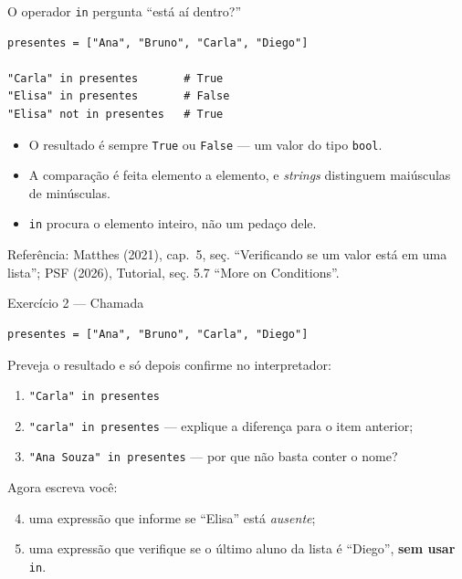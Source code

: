 \documentclass[aspectratio=169]{beamer}
\newcommand{\fonte}[1]{\vfill{\scriptsize\color{UFSGray}Refer\^encia: #1}}
\begin{document}
\begin{frame}[fragile]{O operador \texttt{in} pergunta ``está aí dentro?''}
\begin{lstlisting}
presentes = ["Ana", "Bruno", "Carla", "Diego"]

"Carla" in presentes       # True
"Elisa" in presentes       # False
"Elisa" not in presentes   # True
\end{lstlisting}

\begin{itemize}
  \item O resultado é sempre \texttt{True} ou \texttt{False} --- um valor do tipo \texttt{bool}.
  \item A comparação é feita elemento a elemento, e \emph{strings} distinguem maiúsculas de minúsculas.
  \item \texttt{in} procura o elemento inteiro, não um pedaço dele.
\end{itemize}

\fonte{Matthes (2021), cap.\ 5, se\c{c}. ``Verificando se um valor est\'a em uma lista''; PSF (2026), Tutorial, se\c{c}. 5.7 ``More on Conditions''.}
\end{frame}

\begin{frame}[fragile]{Exercício 2 --- Chamada}
\begin{lstlisting}
presentes = ["Ana", "Bruno", "Carla", "Diego"]
\end{lstlisting}

Preveja o resultado e só depois confirme no interpretador:
\begin{enumerate}
  \item \texttt{"Carla" in presentes}
  \item \texttt{"carla" in presentes} --- explique a diferença para o item anterior;
  \item \texttt{"Ana Souza" in presentes} --- por que não basta conter o nome?
\end{enumerate}

Agora escreva você:
\begin{enumerate}
  \setcounter{enumi}{3}
  \item uma expressão que informe se ``Elisa'' está \emph{ausente};
  \item uma expressão que verifique se o último aluno da lista é ``Diego'', \textbf{sem usar} \texttt{in}.
\end{enumerate}
\end{frame}

\end{document}
